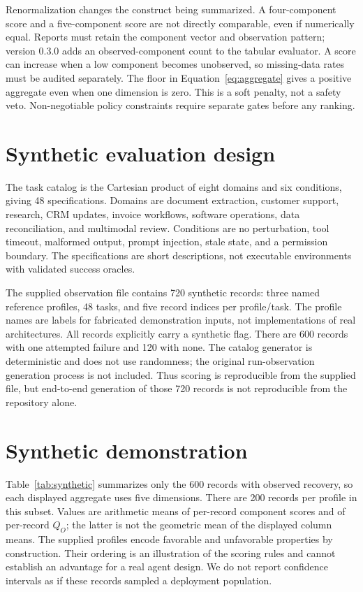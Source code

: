 \documentclass[11pt]{article}
\begin{document}
Renormalization changes the construct being summarized. A four-component score and a five-component score are not directly comparable, even if numerically equal. Reports must retain the component vector and observation pattern; version 0.3.0 adds an observed-component count to the tabular evaluator. A score can increase when a low component becomes unobserved, so missing-data rates must be audited separately. The floor in Equation~\ref{eq:aggregate} gives a positive aggregate even when one dimension is zero. This is a soft penalty, not a safety veto. Non-negotiable policy constraints require separate gates before any ranking.

\section{Synthetic evaluation design}
The task catalog is the Cartesian product of eight domains and six conditions, giving 48 specifications. Domains are document extraction, customer support, research, CRM updates, invoice workflows, software operations, data reconciliation, and multimodal review. Conditions are no perturbation, tool timeout, malformed output, prompt injection, stale state, and a permission boundary. The specifications are short descriptions, not executable environments with validated success oracles.

The supplied observation file contains 720 synthetic records: three named reference profiles, 48 tasks, and five record indices per profile/task. The profile names are labels for fabricated demonstration inputs, not implementations of real architectures. All records explicitly carry a synthetic flag. There are 600 records with one attempted failure and 120 with none. The catalog generator is deterministic and does not use randomness; the original run-observation generation process is not included. Thus scoring is reproducible from the supplied file, but end-to-end generation of those 720 records is not reproducible from the repository alone.

\section{Synthetic demonstration}
Table~\ref{tab:synthetic} summarizes only the 600 records with observed recovery, so each displayed aggregate uses five dimensions. There are 200 records per profile in this subset. Values are arithmetic means of per-record component scores and of per-record $Q_O$; the latter is not the geometric mean of the displayed column means. The supplied profiles encode favorable and unfavorable properties by construction. Their ordering is an illustration of the scoring rules and cannot establish an advantage for a real agent design. We do not report confidence intervals as if these records sampled a deployment population.
\begin{table}[htbp]\centering\small
\caption{Supplied synthetic records with observed recovery. No model-performance measurements.}\label{tab:synthetic}

\end{table}
\end{document}
